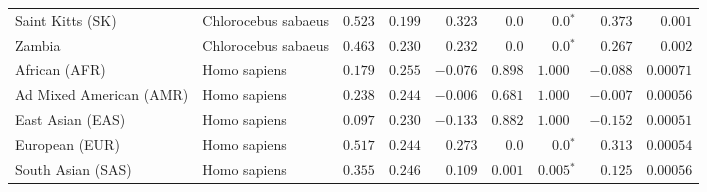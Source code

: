 \begin{center}
\begin{adjustbox}{width = 1\textwidth}
\begin{tabular}{|l|l|r|r|r|r|r|r|r|}
            Saint Kitts (SK)                  & Chlorocebus sabaeus        & $ 0.523$ & $ 0.199$ & $ 0.323$ & $0.0$ & $\bm{0.0{^*}}$        & $ 0.373$ & $ 0.001$ \\
            Zambia        & Chlorocebus sabaeus        & $ 0.463$ & $ 0.230$ & $ 0.232$ & $0.0$ & $\bm{0.0{^*}}$ & $ 0.267$ & $ 0.002$ \\
            African (AFR)               & Homo sapiens        & $ 0.179$ & $ 0.255$ & $-0.076$ & $ 0.898$ & $ 1.000~~$        & $-0.088$ & $0.00071$ \\
            Ad Mixed American (AMR)                 & Homo sapiens        & $ 0.238$ & $ 0.244$ & $-0.006$ & $ 0.681$    & $ 1.000~~$    & $-0.007$ & $0.00056$ \\
            East Asian (EAS)              & Homo sapiens        & $ 0.097$ & $ 0.230$ & $-0.133$ & $ 0.882$ & $ 1.000~~$ & $-0.152$ & $0.00051$ \\
            European (EUR)              & Homo sapiens        & $ 0.517$ & $ 0.244$ & $ 0.273$ & $0.0$ & $\bm{0.0{^*}}$ & $ 0.313$ & $0.00054$ \\
            South Asian (SAS)              & Homo sapiens        & $ 0.355$ & $ 0.246$ & $ 0.109$ & $ 0.001$ & $\bm{ 0.005{^*}}$ & $ 0.125$ & $0.00056$ \\
            \bottomrule
        \end{tabular}
    \end{adjustbox}
\end{center}